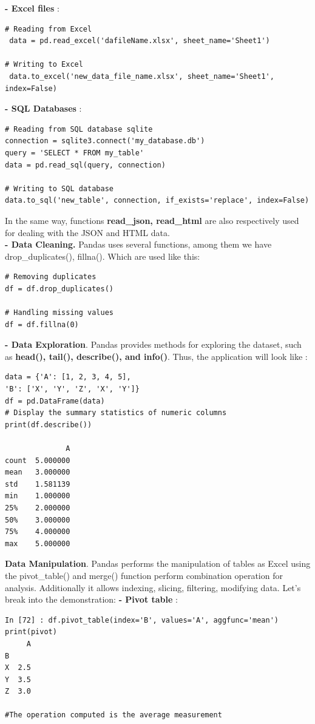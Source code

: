 \documentclass[12pt,a4paper, oneside]{book}
\begin{document}
\noindent \textbf{- Excel files} : 
 \begin{lstlisting}[style=stylejupyter]
# Reading from Excel
 data = pd.read_excel('dafileName.xlsx', sheet_name='Sheet1')

# Writing to Excel
 data.to_excel('new_data_file_name.xlsx', sheet_name='Sheet1', index=False)
 \end{lstlisting} 
 
 \textbf{- SQL Databases} :
  \begin{lstlisting}[style=stylejupyter]
# Reading from SQL database sqlite
connection = sqlite3.connect('my_database.db')
query = 'SELECT * FROM my_table'
data = pd.read_sql(query, connection)

# Writing to SQL database
data.to_sql('new_table', connection, if_exists='replace', index=False)
 \end{lstlisting}
 
In the same way, functions \textbf{read\_json, read\_html}  are also respectively used for dealing with the JSON and HTML data.\\

\textbf{- Data Cleaning.} Pandas uses several functions, among them we have drop\_duplicates(), fillna(). Which are used like this:
\begin{lstlisting}[style=stylejupyter]
# Removing duplicates
df = df.drop_duplicates()

# Handling missing values
df = df.fillna(0)
\end{lstlisting} 

\textbf{- Data Exploration}. Pandas provides methods for exploring the dataset, such as \textbf{head(), tail(), describe(), and info()}. Thus, the application will look like :
\begin{lstlisting}[style=stylejupyter]
data = {'A': [1, 2, 3, 4, 5],
'B': ['X', 'Y', 'Z', 'X', 'Y']}
df = pd.DataFrame(data)
# Display the summary statistics of numeric columns
print(df.describe()) 

              A
count  5.000000
mean   3.000000
std    1.581139
min    1.000000
25%    2.000000
50%    3.000000
75%    4.000000
max    5.000000
\end{lstlisting} 

\noindent \textbf{Data Manipulation}. Pandas performs the manipulation of tables as Excel using the pivot\_table() and merge() function perform combination operation for analysis.
Additionally it allows indexing, slicing, filtering, modifying data. Let's break into the demonstration:
\newline
\textbf{- Pivot table }:
\begin{lstlisting}[style=stylejupyter]
In [72] : df.pivot_table(index='B', values='A', aggfunc='mean')
print(pivot) 
     A
B     
X  2.5
Y  3.5
Z  3.0 

#The operation computed is the average measurement
\end{lstlisting} 
\end{document}
